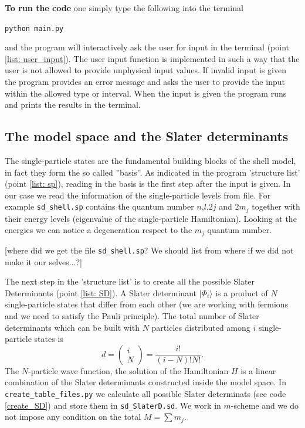 \documentclass[twoside]{article}
\newcommand{\ket}[1]{| #1 \rangle}
\begin{document}
\noindent \textbf{To run the code} one simply type the following into the terminal
\begin{center}\texttt{python main.py}\end{center} 
and the program will interactively ask the user for input in the terminal (point \ref{list: user_input}). The user input function is implemented in such a way that the user is not allowed to provide unphysical input values. If invalid input is given the program provides an error message and asks the user to provide the input within the allowed type or interval. When the input is given the program runs and prints the results in the terminal.

\subsection{The model space and the Slater determinants}

The single-particle states are the fundamental building blocks of the shell model, in fact they form the so called ''basis''. As indicated in the program 'structure list' (point \ref{list: sp}), reading in the basis is the first step after the input is given. In our case we read the information of the single-particle levels from file. For example \texttt{sd\_shell.sp} contains the quantum number $n$,$l$,$2j$ and $2m_j$ together with their energy levels (eigenvalue of the single-particle Hamiltonian). Looking at the energies we can notice a degeneration respect to the $m_j$ quantum number.

[where did we get the file \texttt{sd\_shell.sp}? We should list from where if we did not make it our selves...?]

The next step in the 'structure list' is to create all the possible Slater Determinants (point \ref{list: SD}). A Slater determinant $\ket{\Phi_i}$ is a product of $N$ single-particle states that differ from each other (we are working with fermions and we need to satisfy the Pauli principle). The total number of Slater determinants which can be built with $N$ particles distributed among $i$ single-particle states is
\begin{equation}\label{binSD}
d=\left (\begin{array}{c} i \\ N\end{array} \right) =\frac{i!}{(i-N)!N!}. 
\end{equation}
The $N$-particle wave function, the solution of the Hamiltonian $H$ is a linear combination of the Slater determinants constructed inside the model space. In \texttt{create\_table\_files.py} we calculate all possible Slater determinats (see code \ref{create_SD}) and store them in \texttt{sd\_SlaterD.sd}. We work in $m$-scheme and we do not impose any condition on the total $M= \sum m_j$.
\end{document}

